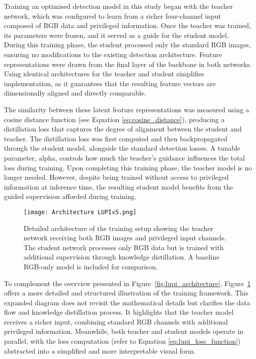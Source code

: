 Training an optimised detection model in this study began with the teacher network, which was configured to learn from a richer four-channel input composed of RGB data and privileged information. Once the teacher was trained, its parameters were frozen, and it served as a guide for the student model. During this training phase, the student processed only the standard RGB images, ensuring no modifications to the existing detection architecture. Feature representations were drawn from the final layer of the backbone in both networks. Using identical architectures for the teacher and student simplifies implementation, as it guarantees that the resulting feature vectors are dimensionally aligned and directly comparable.

The similarity between these latent feature representations was measured using a cosine distance function (see Equation \ref{eq:cosine_distance}), producing a distillation loss that captures the degree of alignment between the student and teacher. The distillation loss was first computed and then backpropagated through the student model, alongside the standard detection losses. A tunable parameter, \gls{alpha}, controls how much the teacher’s guidance influences the total loss during training. Upon completing this training phase, the teacher model is no longer needed. However, despite being trained without access to privileged information at inference time, the resulting student model benefits from the guided supervision afforded during training.


\begin{figure}[ht]
\centering
\texttt{[image: Architecture LUPIv5.png]}
\caption{Detailed architecture of the training setup showing the teacher network receiving both RGB images and privileged input channels. The student network processes only RGB data but is trained with additional supervision through knowledge distillation. A baseline RGB-only model is included for comparison.}
\label{fig:lupi_architecture_final}
\end{figure}


To complement the overview presented in Figure~\ref{fig:lupi_architecture}, Figure~\ref{fig:lupi_architecture_final} offers a more detailed and structured illustration of the training framework. This expanded diagram does not revisit the mathematical details but clarifies the data flow and knowledge distillation process. It highlights that the teacher model receives a richer input, combining standard RGB channels with additional privileged information. Meanwhile, both teacher and student models operate in parallel, with the loss computation (refer to Equation \ref{eq:lupi_loss_function}) abstracted into a simplified and more interpretable visual form.


